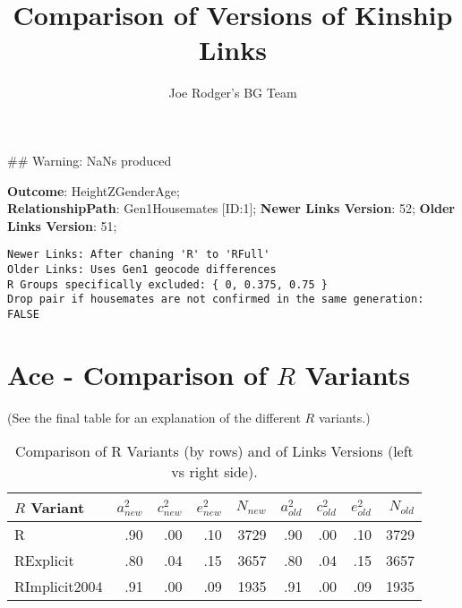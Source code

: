 \documentclass{article}\usepackage{graphicx, color}
\title{Comparison of Versions of Kinship Links}
\author{Joe Rodger's BG Team}
\makeatletter
\newenvironment{kframe}{%
 \def\at@end@of@kframe{}%
 \ifinner\ifhmode%
  \def\at@end@of@kframe{\end{minipage}}%
  \begin{minipage}{\columnwidth}%
 \fi\fi%
 \def\FrameCommand##1{\hskip\@totalleftmargin \hskip-\fboxsep
 \colorbox{shadecolor}{##1}\hskip-\fboxsep
     \hskip-\linewidth \hskip-\@totalleftmargin \hskip\columnwidth}%
 \MakeFramed {\advance\hsize-\width
   \@totalleftmargin\z@ \linewidth\hsize
   \@setminipage}}%
 {\par\unskip\endMakeFramed%
 \at@end@of@kframe}
\newenvironment{knitrout}{}{} %
\makeatother
\begin{document}
\maketitle
\setcounter{totalnumber}{8} %

\setlength{\parindent}{0pt}%




\begin{knitrout}
\color{fgcolor}\begin{kframe}


{\ttfamily\noindent\textcolor{warningcolor}{\#\# Warning: NaNs produced}}\end{kframe}
\end{knitrout}


\textbf{Outcome}: HeightZGenderAge;\\
\textbf{RelationshipPath}: Gen1Housemates [ID:1];
\textbf{Newer Links Version}: 52;
\textbf{Older Links Version}: 51;

\begin{knitrout}
\color{fgcolor}\begin{kframe}
\begin{verbatim}
Newer Links: After chaning 'R' to 'RFull'
Older Links: Uses Gen1 geocode differences
R Groups specifically excluded: { 0, 0.375, 0.75 }
Drop pair if housemates are not confirmed in the same generation: FALSE
\end{verbatim}
\end{kframe}
\end{knitrout}





\section{Ace - Comparison of $R$ Variants} 
(See the final table for an explanation of the different $R$ variants.)
\begin{table}[ht]
\begin{center}
{\large
\begin{tabular}{l|rrrr|rrrr}
  \hline
$R$ Variant & $a_{new}^2$ & $c_{new}^2$ & $e_{new}^2$ & $N_{new}$ & $a_{old}^2$ & $c_{old}^2$ & $e_{old}^2$ & $N_{old}$ \\ 
  \hline
R & .90 & .00 & .10 & 3729 & .90 & .00 & .10 & 3729 \\ 
  RExplicit & .80 & .04 & .15 & 3657 & .80 & .04 & .15 & 3657 \\ 
  RImplicit2004 & .91 & .00 & .09 & 1935 & .91 & .00 & .09 & 1935 \\ 
   \hline
\end{tabular}
}
\caption{Comparison of R Variants (by rows) and of Links Versions (left vs right side).}
\end{center}
\end{table}
\end{document}
